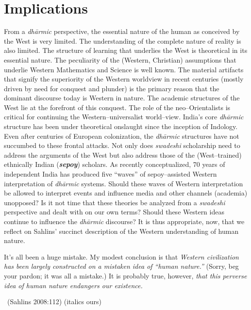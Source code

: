 \section*{Implications}

From a \textit{dhārmic} perspective, the essential nature of the human as conceived by the West is very limited. The understanding of the complete nature of reality is also limited. The structure of learning that underlies the West is theoretical in its essential nature. The peculiarity of the (Western, Christian) assumptions that underlie Western Mathematics and Science is well known. The material artifacts that signify the superiority of the Western worldview in recent centuries (mostly driven by need for conquest and plunder) is the primary reason that the dominant discourse today is Western in nature. The academic structures of the West lie at the forefront of this conquest. The role of the neo–Orientalists is critical for continuing the Western–universalist world–view. India's core \textit{dhārmic} structure has been under theoretical onslaught since the inception of Indology. Even after centuries of European colonization, the \textit{dhārmic} structures have not succumbed to these frontal attacks. Not only does \textit{swadeshi} scholarship need to address the arguments of the West but also address those of the (West–trained) ethnically Indian (\textbf{\textit{sepoy}}) scholars. As recently conceptualized, 70 years of independent India has produced five “waves” of sepoy–assisted Western interpretation of \textit{dhārmic} systems. Should these waves of Western interpretation be allowed to interpret events and influence media and other channels (academia) unopposed? Is it not time that these theories be analyzed from a \textit{swadeshi} perspective and dealt with on our own terms? Should these Western ideas continue to influence the \textit{dhārmic} discourse? It is thus appropriate, now, that we reflect on Sahlins' succinct description of the Western understanding of human nature.

\begin{myquote}
It's all been a huge mistake. My modest conclusion is that \textit{Western civilization has been largely constructed on a mistaken idea of “human nature.”} (Sorry, beg your pardon; it was all a mistake.) It is probably true, however, \textit{that this perverse idea of human nature endangers our existence.} 

~\hfill (Sahlins 2008:112) (italics ours)
\end{myquote}


